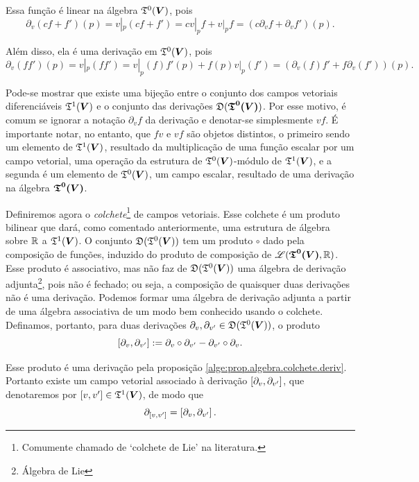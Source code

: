 Essa função é linear na álgebra $\mathfrak{T}^0(\bm V)$, pois
	\begin{equation*}
	\partial_v(cf+f')(p) = v|_p(cf+f') = cv|_p f + v|_p f = (c\partial_v f + \partial_v f')(p).
	\end{equation*}

Além disso, ela é uma derivação em $\mathfrak{T}^0(\bm V)$, pois
	\begin{equation*}
	\partial_v(ff')(p) = v|_p(ff') = v|_p(f)f'(p) + f(p) v|_p(f') = (\partial_v(f)f'+f\partial_v(f'))(p).
	\end{equation*}

Pode-se mostrar que existe uma bijeção entre o conjunto dos campos vetoriais diferenciáveis $\mathfrak{T}^1(\bm V)$ e o conjunto das derivações $\mathfrak{D}(\bm{\mathfrak{T}^0(\bm V)})$.
 Por esse motivo, é comum se ignorar a notação $\partial_v f$ da derivação e denotar-se simplesmente $vf$. É importante notar, no entanto, que $fv$ e $vf$ são objetos distintos, o primeiro sendo um elemento de $\mathfrak{T}^1(\bm V)$, resultado da multiplicação de uma função escalar por um campo vetorial, uma operação da estrutura de $\mathfrak{T}^0(\bm V)$-módulo de $\mathfrak{T}^1(\bm V)$, e a segunda é um elemento de $\mathfrak{T}^0(\bm V)$, um campo escalar, resultado de uma derivação na álgebra $\bm{\mathfrak{T}^0(\bm V)}$.

Definiremos agora o \textit{colchete}\footnote{Comumente chamado de `colchete de Lie' na literatura.} de campos vetoriais. Esse colchete é um produto bilinear que dará, como comentado anteriormente, uma estrutura de álgebra sobre $\mathbb{R}$ a $\mathfrak{T}^1(\bm V)$. O conjunto $\mathfrak{D}(\mathfrak{T}^0(\bm V))$ tem um produto $\circ$ dado pela composição de funções, induzido do produto de composição de $\mathscr{L}(\bm{\mathfrak{T}^0(\bm V)},\mathbb{R})$. Esse produto é associativo, mas não faz de $\mathfrak{D}(\mathfrak{T}^0(\bm V))$ uma álgebra de derivação adjunta\footnote{Álgebra de Lie}, pois não é fechado; ou seja, a composição de quaisquer duas derivações não é uma derivação. Podemos formar uma álgebra de derivação adjunta a partir de uma álgebra associativa de um modo bem conhecido usando o colchete. Definamos, portanto, para duas derivações $\partial_v,\partial_{v'} \in \mathfrak{D}(\mathfrak{T}^0(\bm V))$, o produto
	\begin{equation*}
	\left[{\partial_v},{\partial_{v'}}\right] := \partial_v \circ \partial_{v'} - \partial_{v'} \circ \partial_v.
	\end{equation*}

Esse produto é uma derivação pela proposição \ref{alge:prop.algebra.colchete.deriv}. Portanto existe um campo vetorial associado à derivação $\left[{\partial_v},{\partial_{v'}}\right]$, que denotaremos por $\left[{v},{v'}\right] \in \mathfrak{T}^1(\bm V)$, de modo que
	\begin{equation*}
	\partial_{\left[{v},{v'}\right]} = \left[{\partial_v},{\partial_{v'}}\right].
	\end{equation*}


